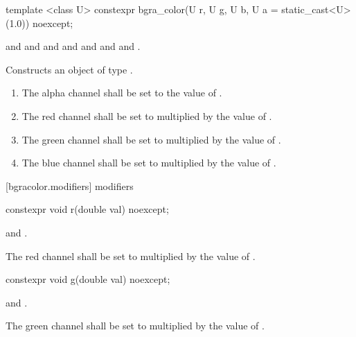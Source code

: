\begin{itemdecl}
template <class U>
constexpr bgra_color(U r, U g, U b, U a = static_cast<U>(1.0)) noexcept;
\end{itemdecl}
\begin{itemdescr}
\pnum
\requires
{} and  and  and  and  and  and  and .

\pnum
\effects
Constructs an object of type .

\begin{enumerate}
\item The alpha channel shall be set to the value of .
\item The red channel shall be set to  multiplied by the value of  .
\item The green channel shall be set to  multiplied by the value of .
\item The blue channel shall be set to  multiplied by the value of .
\end{enumerate}
\end{itemdescr}


 [bgracolor.modifiers]{ modifiers}

\begin{itemdecl}
constexpr void r(double val) noexcept;
\end{itemdecl}

\begin{itemdescr}
\pnum
\requires
{} and .

\pnum
\effects
The red channel shall be set to  multiplied by the value of  .
\end{itemdescr}

\begin{itemdecl}
constexpr void g(double val) noexcept;
\end{itemdecl}
\begin{itemdescr}
\pnum
\requires
{} and .

\pnum
\effects
The green channel shall be set to  multiplied by the value of  .
\end{itemdescr}

